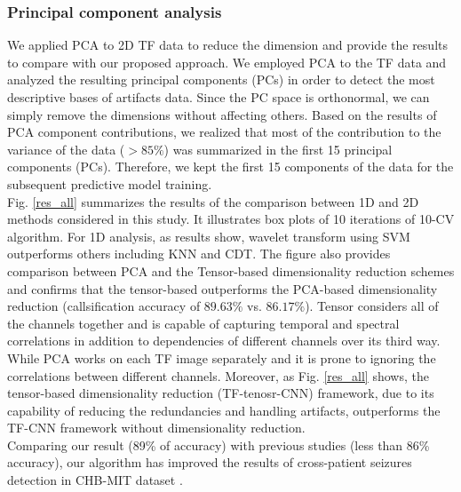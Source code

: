 \documentclass{article}
\begin{document}
\subsubsection{Principal component analysis}
\vspace{-5pt}
We applied PCA to 2D TF data to reduce the dimension and provide the results to compare with our proposed approach. 
We employed PCA to the TF data and analyzed the resulting principal
components (PCs) in order to detect the most descriptive bases of artifacts data. Since the PC space is
orthonormal, we can simply remove the dimensions without affecting others. Based on the results of PCA component contributions, we realized that most of the contribution to the variance of the data ($>85\%$) was summarized
in the first 15 principal components (PCs). Therefore, we kept the first 15 components of the data
for the subsequent predictive model training.\\
\indent Fig. \ref{res_all} summarizes the results of the comparison between 1D and 2D methods considered in this study. It illustrates box plots of 10 iterations of 10-CV algorithm. 
For 1D analysis, as results show, wavelet transform using SVM outperforms others including KNN and CDT. The figure also provides comparison between PCA and the Tensor-based dimensionality reduction schemes and confirms that the tensor-based outperforms the PCA-based dimensionality reduction (callsification accuracy of $89.63\%$ vs. $86.17\%$). Tensor considers all of the channels together and is capable of capturing temporal  and  spectral correlations in  addition to dependencies of different channels over its third way. While PCA works on each TF image separately and it is prone to ignoring the correlations between different channels. Moreover, as Fig. \ref{res_all} shows, the tensor-based dimensionality reduction (TF-tenosr-CNN) framework, due to its capability of reducing the redundancies and handling artifacts, outperforms the TF-CNN framework
without dimensionality reduction.    \\
\indent Comparing our result (89\% of accuracy) with previous studies (less than 86\% accuracy), our algorithm has improved the results of cross-patient seizures detection in CHB-MIT dataset \cite{Tzallas,Thodoroff}.


\vspace{-3mm}
\end{document}
